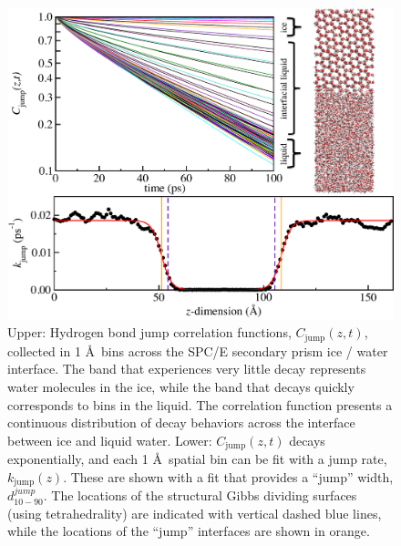 \begin{figure}
\includegraphics[width=5.5in]{Figures/secPrismJumpPlot}
\caption{\label{fig:SPkjmp} Upper: Hydrogen bond jump correlation
  functions, $C_\mathrm{jump}(z,t)$, collected in 1 \AA~bins across
  the SPC/E secondary prism ice / water interface. The band that
  experiences very little decay represents water molecules in the ice,
  while the band that decays quickly corresponds to bins in the
  liquid.  The correlation function presents a continuous distribution
  of decay behaviors across the interface between ice and liquid
  water.  Lower: $C_\mathrm{jump}(z,t)$ decays exponentially, and each
  1 \AA~spatial bin can be fit with a jump rate, $k_\mathrm{jump}(z)$.
  These are shown with a fit that provides a ``jump'' width,
  $d_\mathrm{10-90}^{jump}$. The locations of the structural Gibbs dividing
  surfaces (using tetrahedrality) are indicated with vertical dashed
  blue lines, while the locations of the ``jump'' interfaces are shown in
  orange.}
\end{figure}


